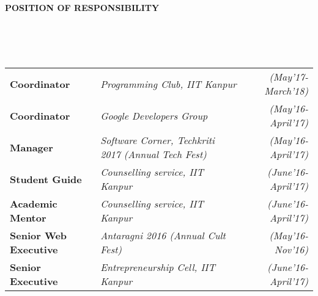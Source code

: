 \documentclass[a4paper,10pt]{article}
\newcommand{\lsep}{-0.5cm}
\newcommand{\resheading}[1]{{\small \colorbox{mygrey}{\begin{minipage}{0.975\textwidth}{\textbf{#1 \vphantom{p\^{E}}}}\end{minipage}}}}
\begin{document}
\resheading{\textbf{POSITION OF RESPONSIBILITY} }\\[\lsep]
\\ \\ \indent
\begin{tabular}{l @{\hskip 0.5in}l @{\hskip 0.3in}r }
\textbf{Coordinator} & \textit{Programming Club, IIT Kanpur} & \emph{(May'17-March'18)}\\
\textbf{Coordinator} & \textit{Google Developers Group} &
\emph{(May'16-April'17)}\\
\textbf{Manager} & \textit{Software Corner, Techkriti 2017 (Annual Tech Fest)} &
\emph{(May'16-April'17)}\\
\textbf{Student Guide} & \textit{Counselling service, IIT Kanpur} & \emph{(June'16-April'17)}\\
\textbf{Academic Mentor} & \textit{Counselling service, IIT Kanpur} & \emph{(June'16-April'17)}\\
\textbf{Senior Web Executive} & \textit{Antaragni 2016 (Annual Cult Fest)} & \emph{(May'16-Nov'16)}\\
\textbf{Senior Executive} & \textit{Entrepreneurship Cell, IIT Kanpur} & \emph{(June'16-April'17)}\\
\end{tabular}
\end{document}
